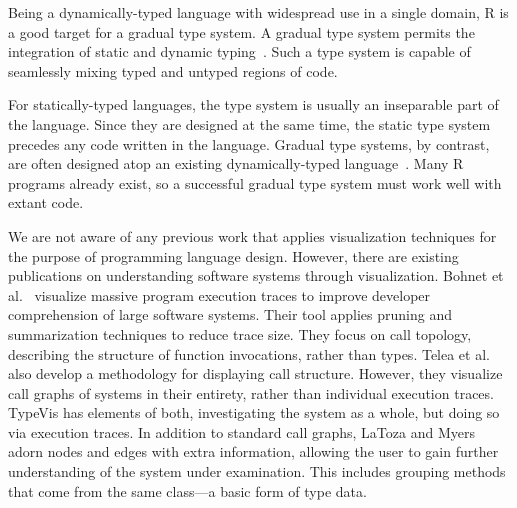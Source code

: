 \documentclass{vgtc}                          %
\newcommand{\typevis}{{\sc TypeVis}\xspace}
\begin{document}
Being a dynamically-typed language
with widespread use in a single domain,
R is a good target for a gradual type system.
A gradual type system permits the integration of
static and dynamic typing~\cite{siek:2006,tobin-hochstadt:2006}.
Such a type system is capable of seamlessly mixing typed and untyped regions of code.

For statically-typed languages, the type system is usually
an inseparable part of the language. Since they are designed
at the same time, the static type system precedes any code written
in the language.
Gradual type systems, by contrast, are often designed atop
an existing dynamically-typed language~\cite{tobin-hochstadt:2016}.
Many R programs already exist,
so a successful gradual type system must
work well with extant code.

We are not aware of any previous work that applies
visualization techniques for the purpose of programming language design.
However, there are existing publications on understanding
software systems through visualization.
Bohnet et al.~\cite{bohnet:2009} visualize massive program execution traces
to improve developer comprehension of large software systems.
Their tool applies pruning and summarization techniques to reduce trace size.
They focus on call topology,
describing the structure of function invocations,
rather than types.
Telea et al.~\cite{telea:2009} also develop a methodology for displaying call structure.
However, they visualize call graphs of systems in their entirety,
rather than individual execution traces.
\typevis has elements of both,
investigating the system as a whole,
but doing so via execution traces.
In addition to standard call graphs,
LaToza and Myers~\cite{latoza:2011} adorn nodes and edges with extra information,
allowing the user to gain further understanding of the system
under examination.
This includes grouping methods that come from the same class---a
basic form of type data.

\end{document}
